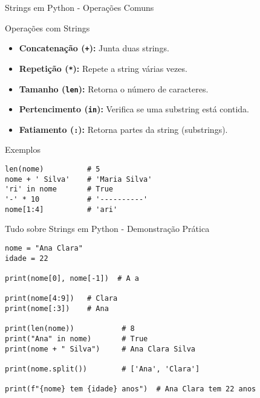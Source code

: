 \begin{frame}[fragile]{Strings em Python - Operações Comuns}



    \begin{block}{Operações com Strings}
        \begin{itemize}
            \item \textbf{Concatenação (\texttt{+}):} Junta duas strings.
            \item \textbf{Repetição (\texttt{*}):} Repete a string várias vezes.
            \item \textbf{Tamanho (\texttt{len}):} Retorna o número de caracteres.
            \item \textbf{Pertencimento (\texttt{in}):} Verifica se uma substring está contida.
            \item \textbf{Fatiamento (\texttt{:}):} Retorna partes da string (substrings).
        \end{itemize}
    \end{block}


    \begin{block}{Exemplos}
        \begin{verbatim}
len(nome)          # 5
nome + ' Silva'    # 'Maria Silva'
'ri' in nome       # True
'-' * 10           # '----------'
nome[1:4]          # 'ari'
\end{verbatim}
    \end{block}


\end{frame}


\begin{frame}[fragile]{Tudo sobre Strings em Python - Demonstração Prática}



    \begin{verbatim}
nome = "Ana Clara"
idade = 22

print(nome[0], nome[-1])  # A a

print(nome[4:9])   # Clara
print(nome[:3])    # Ana

print(len(nome))           # 8
print("Ana" in nome)       # True
print(nome + " Silva")     # Ana Clara Silva

print(nome.split())        # ['Ana', 'Clara']

print(f"{nome} tem {idade} anos")  # Ana Clara tem 22 anos
\end{verbatim}
\end{frame}


